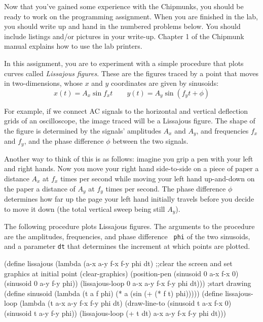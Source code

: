 Now that you've gained some experience with the Chipmunks, you should
be ready to work on the programming assignment.  When you are finished
in the lab, you should write up and hand in the numbered problems
below.  You should include listings and/or pictures in your
write-up.  Chapter 1 of the Chipmunk manual explains how to use the
lab printers.

\newpage

In this assignment, you are to experiment with a simple procedure that
plots curves called {\em Lissajous figures}.  These are the figures
traced by a point that moves in two-dimensions, whose $x$ and $y$
coordinates are given by sinusoids:
\begin{displaymath}
   x(t) = A_x \sin f_xt \qquad y(t) = A_y \sin (f_y t + \phi)
\end{displaymath}

For example, if we connect AC signals to the horizontal and vertical
deflection grids of an oscilloscope, the image traced will be a
Lissajous figure.  The shape of the figure is determined by the
signals' amplitudes $A_x$ and $A_y$, and frequencies $f_x$ and $f_y$,
and the phase difference $\phi$ between the two signals.

Another way to think of this is as follows: imagine you grip a pen with your
left and right hands.  Now you move your right hand side-to-side on a piece of
paper a distance $A_x$ at $f_x$ times per second while moving your left hand
up-and-down on the paper a distance of $A_y$ at $f_y$ times per second.  The
phase difference $\phi$ determines how far up the page your left hand initially
travels before you decide to move it down (the total vertical sweep being still
$A_y$).

The following procedure plots Lissajous figures.  The arguments to the
procedure are the amplitudes, frequencies, and phase difference {\tt
phi} of the two sinusoids, and a parameter {\tt dt} that determines
the increment at which points are plotted.

\beginlisp
(define lissajous
  (lambda (a-x a-y f-x f-y phi dt)
    ;;clear the screen and set graphics at initial point
    (clear-graphics)
    (position-pen (sinusoid 0 a-x f-x 0)
                  (sinusoid 0 a-y f-y phi))
    (lissajous-loop 0 a-x a-y f-x f-y phi dt))) ;start drawing
\null
(define sinusoid
  (lambda (t a f phi)
    (* a (sin (+ (* f t) phi)))))
\null
(define lissajous-loop
  (lambda (t a-x a-y f-x f-y phi dt)
    (draw-line-to (sinusoid t a-x f-x 0)
                  (sinusoid t a-y f-y phi))
    (lissajous-loop (+ t dt) a-x a-y f-x f-y phi dt)))
\endlisp

